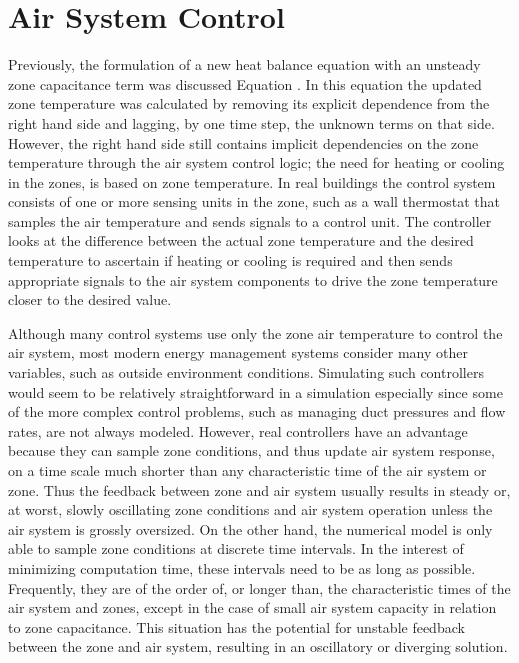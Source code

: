 \section{Air System Control}\label{air-system-control}

Previously, the formulation of a new heat balance equation with an unsteady zone capacitance term was discussed Equation . In this equation the updated zone temperature was calculated by removing its explicit dependence from the right hand side and lagging, by one time step, the unknown terms on that side. However, the right hand side still contains implicit dependencies on the zone temperature through the air system control logic; the need for heating or cooling in the zones, is based on zone temperature. In real buildings the control system consists of one or more sensing units in the zone, such as a wall thermostat that samples the air temperature and sends signals to a control unit. The controller looks at the difference between the actual zone temperature and the desired temperature to ascertain if heating or cooling is required and then sends appropriate signals to the air system components to drive the zone temperature closer to the desired value.

Although many control systems use only the zone air temperature to control the air system, most modern energy management systems consider many other variables, such as outside environment conditions. Simulating such controllers would seem to be relatively straightforward in a simulation especially since some of the more complex control problems, such as managing duct pressures and flow rates, are not always modeled. However, real controllers have an advantage because they can sample zone conditions, and thus update air system response, on a time scale much shorter than any characteristic time of the air system or zone. Thus the feedback between zone and air system usually results in steady or, at worst, slowly oscillating zone conditions and air system operation unless the air system is grossly oversized. On the other hand, the numerical model is only able to sample zone conditions at discrete time intervals. In the interest of minimizing computation time, these intervals need to be as long as possible. Frequently, they are of the order of, or longer than, the characteristic times of the air system and zones, except in the case of small air system capacity in relation to zone capacitance. This situation has the potential for unstable feedback between the zone and air system, resulting in an oscillatory or diverging solution.

